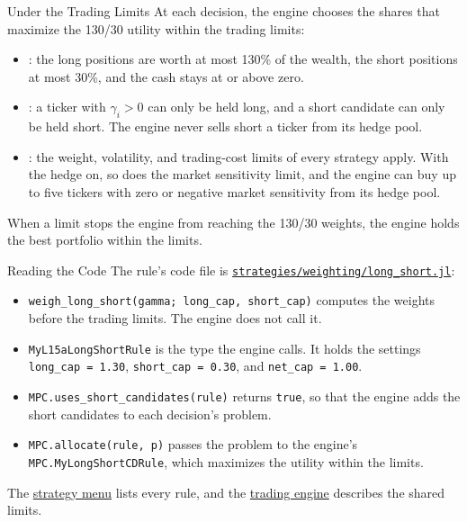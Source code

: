 \documentclass[aspectratio=169,11pt]{beamer}
\newcommand{\repo}{https://github.com/varnerlab/CHEME-5660-CourseRepository-Fall-2026/blob/main/lectures/week-15/L15a}
\begin{document}
\begin{frame}{Under the Trading Limits}
  \vspace{0.3em}
  At each decision, the engine chooses the shares that maximize the 130/30 utility within the trading limits:
  \begin{itemize}\setlength{\itemsep}{0.5em}
    \item {}: the long positions are worth at most 130\% of the wealth, the short positions at most 30\%, and the cash stays at or above zero.
    \item {}: a ticker with $\gamma_{i}>0$ can only be held long, and a short candidate can only be held short. The engine never sells short a ticker from its hedge pool.
    \item {}: the weight, volatility, and trading-cost limits of every strategy apply. With the hedge on, so does the market sensitivity limit, and the engine can buy up to five tickers with zero or negative market sensitivity from its hedge pool.
  \end{itemize}

  \vspace{0.3em}
  When a limit stops the engine from reaching the 130/30 weights, the engine holds the best portfolio within
  the limits.
\end{frame}

\begin{frame}{Reading the Code}
  \vspace{0.3em}
  The rule's code file is
  \href{\repo/strategies/weighting/long_short.jl}{\texttt{strategies/weighting/long\_short.jl}}:
  \begin{itemize}\setlength{\itemsep}{0.5em}
    \item \texttt{weigh\_long\_short(gamma; long\_cap, short\_cap)} computes the weights before the trading limits. The engine does not call it.
    \item \texttt{MyL15aLongShortRule} is the type the engine calls. It holds the settings \texttt{long\_cap~=~1.30}, \texttt{short\_cap~=~0.30}, and \texttt{net\_cap~=~1.00}.
    \item \texttt{MPC.uses\_short\_candidates(rule)} returns \texttt{true}, so that the engine adds the short candidates to each decision's problem.
    \item \texttt{MPC.allocate(rule, p)} passes the problem to the engine's \texttt{MPC.MyLongShortCDRule}, which maximizes the utility within the limits.
  \end{itemize}

  \vspace{0.5em}
  The \href{\repo/strategies/CHEME-5660-L15a-Strategy-Menu-Fall-2026.ipynb}{strategy menu} lists every rule, and the \href{\repo/engine/CHEME-5660-L15a-Trading-Engine-Fall-2026.ipynb}{trading engine} describes the shared limits.
\end{frame}
\end{document}
